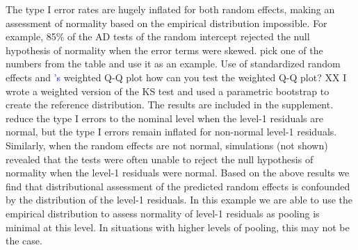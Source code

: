 \documentclass[12pt]{article} %
\newcommand{\citetapos}[1]{\citeauthor{#1}{\textcolor{blue}{'s}} }
\newcommand{\hh}[1]{{\color{orange} #1}}
\newcommand{\al}[1]{{\color{red} #1}}
\begin{document}
The type I error rates are hugely inflated for both random effects, making an assessment of normality based on the empirical distribution impossible. \al{For example, 85\% of the AD tests of the random intercept rejected the null hypothesis of normality when the error terms were skewed.} 
\hh{pick one of the numbers from the table and use it as an example.} 
Use of standardized random effects and \citetapos{Lange:1989uu} weighted Q-Q plot \hh{how can you test the weighted Q-Q plot?} \al{XX I wrote a weighted version of the KS test and used a parametric bootstrap to create the reference distribution. The results are included in the supplement.} reduce the type I errors to the nominal level when the level-1 residuals are normal, but the type I errors remain inflated for non-normal level-1 residuals. Similarly, when the random effects are not normal, simulations (not shown) revealed that the tests were  often unable to reject the null hypothesis of normality when the level-1 residuals were normal. \al{Based on the above results we find that distributional assessment of the predicted random effects is confounded by the distribution of the level-1 residuals.}
In this example we are able to use the empirical distribution to assess normality of  level-1 residuals  as  pooling is minimal at this level. In situations with higher levels of pooling, this may not be the case.
\end{document}

